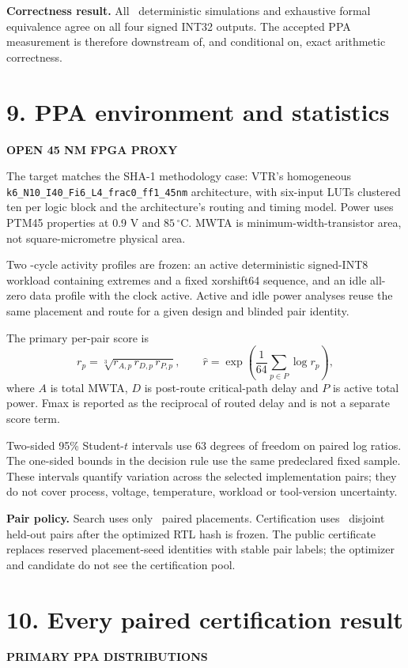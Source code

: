 \documentclass[10pt,a4paper]{article}
\newcommand{\smallcaps}[1]{\textcolor{Mid}{\fontsize{8.5}{10}\selectfont\bfseries\MakeUppercase{#1}}}
\newcommand{\newpageheading}[2]{\clearpage\section{#1}\smallcaps{#2}\vspace{6pt}}
\begin{document}
\begin{claimbox}
\textbf{Correctness result.} All \FunctionalTests\ deterministic simulations and exhaustive formal equivalence agree on all four signed INT32 outputs. The accepted PPA measurement is therefore downstream of, and conditional on, exact arithmetic correctness.
\end{claimbox}

\newpageheading{9. PPA environment and statistics}{Open 45 nm FPGA proxy}

The target matches the SHA-1 methodology case: VTR's homogeneous \texttt{k6\_N10\_I40\_Fi6\_L4\_frac0\_ff1\_45nm} architecture, with six-input LUTs clustered ten per logic block and the architecture's routing and timing model. Power uses PTM45 properties at 0.9 V and $85\,^{\circ}$C. MWTA is minimum-width-transistor area, not square-micrometre physical area.

Two \ActivityCycles-cycle activity profiles are frozen: an active deterministic signed-INT8 workload containing extremes and a fixed xorshift64 sequence, and an idle all-zero data profile with the clock active. Active and idle power analyses reuse the same placement and route for a given design and blinded pair identity.

The primary per-pair score is
\[
r_p=\sqrt[3]{r_{A,p}\,r_{D,p}\,r_{P,p}},
\qquad
\widehat r=\exp\!\left(\frac{1}{64}\sum_{p\in P}\log r_p\right),
\]
where $A$ is total MWTA, $D$ is post-route critical-path delay and $P$ is active total power. Fmax is reported as the reciprocal of routed delay and is not a separate score term.

Two-sided 95\% Student-$t$ intervals use 63 degrees of freedom on paired log ratios. The one-sided bounds in the decision rule use the same predeclared fixed sample. These intervals quantify variation across the selected implementation pairs; they do not cover process, voltage, temperature, workload or tool-version uncertainty.

\begin{scopebox}
\textbf{Pair policy.} Search uses only \SearchPairs\ paired placements. Certification uses \CertificationPairs\ disjoint held-out pairs after the optimized RTL hash is frozen. The public certificate replaces reserved placement-seed identities with stable pair labels; the optimizer and candidate do not see the certification pool.
\end{scopebox}

\newpageheading{10. Every paired certification result}{Primary PPA distributions}
\end{document}
